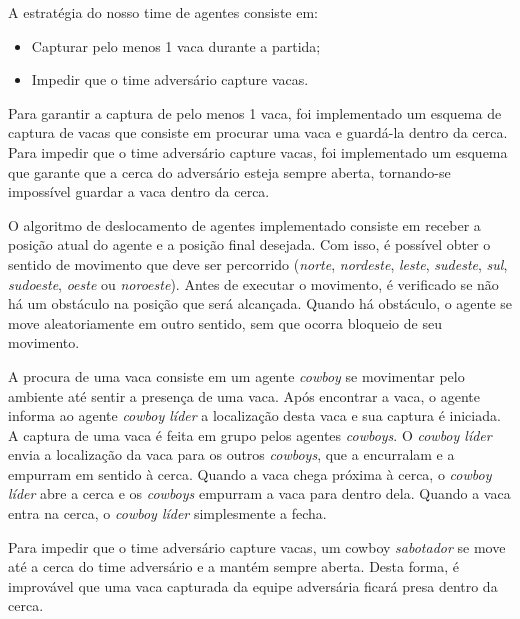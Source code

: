 \documentclass{llncs}
\begin{document}
A estratégia do nosso time de agentes consiste em:

\begin{itemize}
\item Capturar pelo menos 1 vaca durante a partida;
\item Impedir que o time adversário capture vacas.
\end{itemize}

Para garantir a captura de pelo menos 1 vaca, foi implementado um esquema de captura de vacas que consiste em procurar uma vaca e guardá-la dentro da cerca. Para impedir que o time adversário capture vacas, foi implementado um esquema que garante que a cerca do adversário esteja sempre aberta, tornando-se impossível guardar a vaca dentro da cerca.


O algoritmo de deslocamento de agentes implementado consiste em receber a posição atual do agente e a posição final desejada. Com isso, é possível obter o sentido de movimento que deve ser percorrido (\textit{norte}, \textit{nordeste}, \textit{leste}, \textit{sudeste}, \textit{sul}, \textit{sudoeste}, \textit{oeste} ou \textit{noroeste}). Antes de executar o movimento, é verificado se não há um obstáculo na posição que será alcançada. Quando há obstáculo, o agente se move aleatoriamente em outro sentido, sem que ocorra bloqueio de seu movimento.



A procura de uma vaca consiste em um agente \textit{cowboy} se movimentar pelo ambiente até sentir a presença de uma vaca. Após encontrar a vaca, o agente informa ao agente \textit{cowboy líder} a localização desta vaca e sua captura é iniciada. A captura de uma vaca é feita em grupo pelos agentes \textit{cowboys}. O \textit{cowboy líder} envia a localização da vaca para os outros \textit{cowboys}, que a encurralam e a empurram em sentido à cerca. Quando a vaca chega próxima à cerca, o \textit{cowboy líder} abre a cerca e os \textit{cowboys} empurram a vaca para dentro dela. Quando a vaca entra na cerca, o \textit{cowboy líder} simplesmente a fecha.

Para impedir que o time adversário capture vacas, um cowboy \textit{sabotador} se move até a cerca do time adversário e a mantém sempre aberta. Desta forma, é improvável que uma vaca capturada da equipe adversária ficará presa dentro da cerca.

\end{document}
